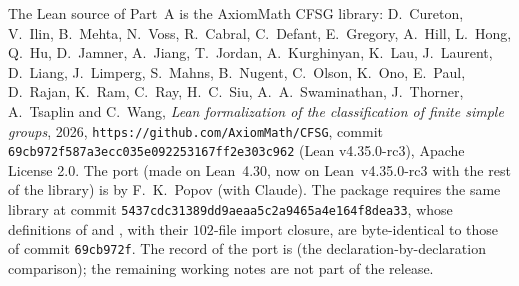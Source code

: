 The Lean source of Part~A is the AxiomMath CFSG library: D.~Cureton, V.~Ilin, B.~Mehta, N.~Voss, R.~Cabral,
C.~Defant, E.~Gregory, A.~Hill, L.~Hong, Q.~Hu, D.~Jamner, A.~Jiang, T.~Jordan, A.~Kurghinyan, K.~Lau,
J.~Laurent, D.~Liang, J.~Limperg, S.~Mahns, B.~Nugent, C.~Olson, K.~Ono, E.~Paul, D.~Rajan, K.~Ram, C.~Ray,
H.~C.~Siu, A.~A.~Swaminathan, J.~Thorner, A.~Tsaplin and C.~Wang, \emph{Lean formalization of the
classification of finite simple groups}, 2026, \texttt{https://github.com/AxiomMath/CFSG}, commit
\texttt{69cb972f587a3ecc035e092253167ff2e303c962} (Lean v4.35.0-rc3), Apache License 2.0.  The port (made on
Lean~4.30, now on Lean~v4.35.0-rc3 with the rest of the library) is by F.~K.~Popov (with Claude).  The package
 requires the same library at commit
\texttt{5437cdc31389dd9aeaa5c2a9465a4e164f8dea33}, whose definitions of  and , with their $102$-file
import closure, are byte-identical to those of commit \texttt{69cb972f}.  The record of the port is
 (the declaration-by-declaration comparison); the
remaining working notes are not part of the release.
